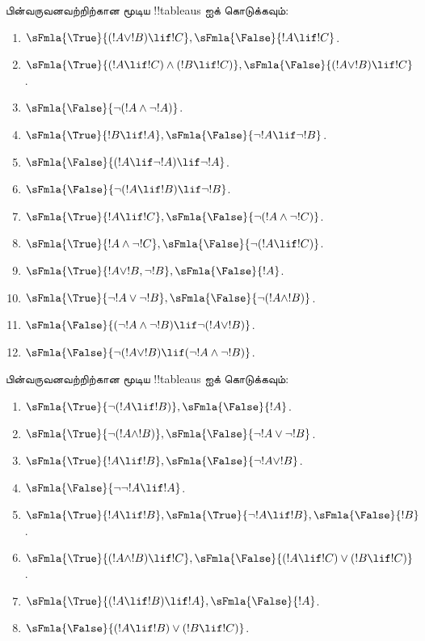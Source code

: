 \documentclass[../../../include/open-logic-section]{subfiles}
\begin{document}
\begin{prob}
பின்வருவனவற்றிற்கான மூடிய !!{tableau}s ஐக் கொடுக்கவும்:
\begin{enumerate}
\item $\sFmla{\True}{(!A \lor !B) \lif !C}, \sFmla{\False}{!A \lif !C}$.
\item $\sFmla{\True}{(!A \lif !C) \land (!B \lif !C)}, \sFmla{\False}{(!A \lor !B) \lif !C}$.
\item $\sFmla{\False}{\lnot(!A \land \lnot !A)}$.
\item $\sFmla{\True}{!B \lif !A}, \sFmla{\False}{\lnot !A \lif \lnot !B}$.
\item $\sFmla{\False}{(!A \lif \lnot !A) \lif \lnot !A}$.
\item $\sFmla{\False}{\lnot(!A \lif !B) \lif \lnot !B}$.
\item $\sFmla{\True}{!A \lif !C}, \sFmla{\False}{\lnot (!A \land \lnot !C)}$.
\item $\sFmla{\True}{!A \land \lnot !C}, \sFmla{\False}{\lnot (!A \lif !C)}$.
\item $\sFmla{\True}{!A \lor !B, \lnot !B}, \sFmla{\False}{!A}$.
\item $\sFmla{\True}{\lnot !A \lor \lnot !B}, \sFmla{\False}{\lnot(!A \land !B)}$.
\item $\sFmla{\False}{(\lnot !A \land \lnot !B) \lif\lnot(!A \lor !B)}$.
\item $\sFmla{\False}{\lnot(!A \lor !B) \lif (\lnot !A \land \lnot !B)}$.
\end{enumerate}
\end{prob}

\begin{prob}
பின்வருவனவற்றிற்கான மூடிய !!{tableau}s ஐக் கொடுக்கவும்:
\begin{enumerate}
\item $\sFmla{\True}{\lnot(!A \lif !B)}, \sFmla{\False}{!A}$.
\item $\sFmla{\True}{\lnot(!A \land !B)}, \sFmla{\False}{\lnot !A \lor \lnot !B}$.
\item $\sFmla{\True}{!A \lif !B}, \sFmla{\False}{\lnot !A \lor !B}$.
\item $\sFmla{\False}{\lnot \lnot !A \lif !A}$.
\item $\sFmla{\True}{!A \lif !B}, \sFmla{\True}{\lnot !A \lif !B}, \sFmla{\False}{!B}$.
\item $\sFmla{\True}{(!A \land !B) \lif !C}, \sFmla{\False}{(!A \lif !C) \lor (!B \lif !C)}$.
\item $\sFmla{\True}{(!A \lif !B) \lif !A}, \sFmla{\False}{!A}$.
\item $\sFmla{\False}{(!A \lif !B) \lor (!B \lif !C)}$.
\end{enumerate}
\end{prob}
\end{document}
